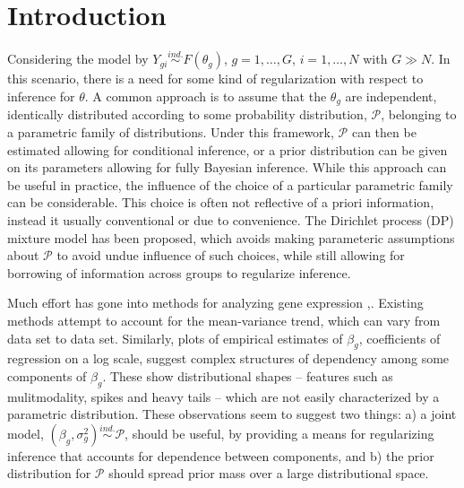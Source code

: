 \newcommand{\ind}{\stackrel{ind.}{\sim}}
\newcommand{\op}{\operatorname}
\newcommand{\code}{\texttt}

\section{Introduction}
Considering the model by $Y_{gi} \ind F(\theta_{g})$, $g=1,\ldots,G$, $i=1,\ldots,N$ with $G\gg N$. In this scenario, there is a need for some kind of regularization with respect to inference for $\theta$. A common approach is to assume that the $\theta_g$ are independent, identically distributed according to some probability distribution, $\mathcal{P}$, belonging to a parametric family of distributions. Under this framework, $\mathcal{P}$ can then be estimated allowing for conditional inference, or a prior distribution can be given on its parameters allowing for fully Bayesian inference. While this approach can be useful in practice, the influence of the choice of a particular parametric family can be considerable. This choice is often not reflective of a priori information, instead it usually conventional or due to convenience. The Dirichlet process (DP) mixture model has been proposed, which avoids making parameteric assumptions about $\mathcal{P}$ to avoid undue influence of such choices, while still allowing for borrowing of information across groups to regularize inference.

Much effort has gone into methods for analyzing gene expression \cite{edger2010},\cite{deseq2014}. Existing methods attempt to account for the mean-variance trend, which can vary from data set to data set. Similarly, plots of empirical estimates of $\beta_g$, coefficients of regression on a log scale, suggest complex structures of dependency among some components of $\beta_g$. These show distributional shapes -- features such as mulitmodality, spikes and heavy tails -- which are not easily characterized by a parametric distribution. These observations seem to suggest two things: a) a joint model, $(\beta_g, \sigma^2_g) \ind \mathcal{P}$, should be useful, by providing a means for regularizing inference that accounts for dependence between components, and b) the prior distribution for $\mathcal{P}$ should spread prior mass over a large distributional space.

